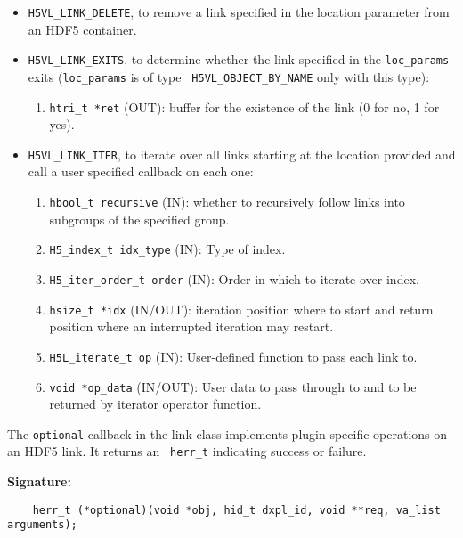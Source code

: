 \begin{itemize}
\item {\tt H5VL\_LINK\_DELETE}, to remove a link specified in the location parameter from an HDF5 container.

\item {\tt H5VL\_LINK\_EXITS}, to determine whether the link specified
  in the {\tt loc\_params} exits ({\tt loc\_params} is of type {\tt
    H5VL\_OBJECT\_BY\_NAME} only with this type):
  \begin{enumerate}
  \item {\tt htri\_t *ret} (OUT): buffer for the existence of the link
    (0 for no, 1 for yes).
  \end{enumerate}

\item {\tt H5VL\_LINK\_ITER}, to iterate over all links starting at the location provided and call a user specified callback on each one:
  \begin{enumerate}
  \item {\tt hbool\_t recursive} (IN): whether to recursively follow links into subgroups of the specified group.\\
  \item {\tt H5\_index\_t idx\_type} (IN): Type of index.\\
  \item {\tt H5\_iter\_order\_t order} (IN): Order in which to iterate over index.\\
  \item {\tt hsize\_t *idx} (IN/OUT):  iteration position where to start and return position where an interrupted iteration may restart.\\
  \item {\tt H5L\_iterate\_t op} (IN): User-defined function to pass each link to. \\
  \item {\tt void *op\_data} (IN/OUT): User data to pass through to and to be returned by iterator operator function. \\
  \end{enumerate}
\end{itemize}

The {\tt optional} callback in the link class implements plugin specific operations on an HDF5 link. It returns an {\tt
  herr\_t} indicating success or failure. 

\textbf{Signature:}
\begin{lstlisting}
    herr_t (*optional)(void *obj, hid_t dxpl_id, void **req, va_list arguments);
\end{lstlisting}

